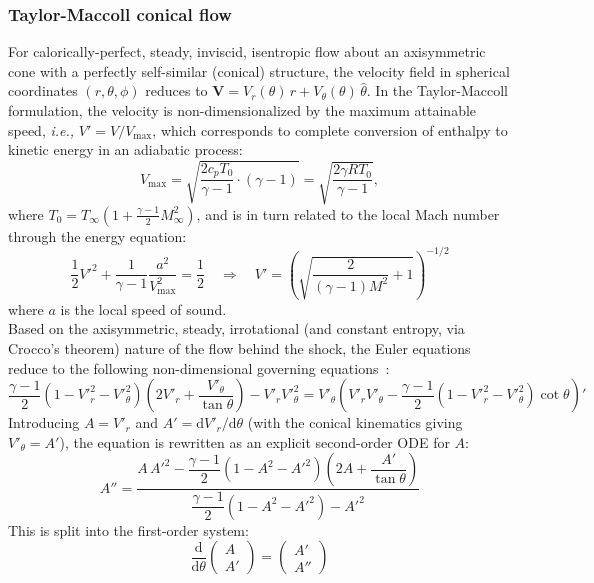 \documentclass[10pt,a4paper]{article}
\begin{document}
\subsubsection{Taylor-Maccoll conical flow}
For calorically-perfect, steady, inviscid, isentropic flow about an axisymmetric cone with a perfectly self-similar (conical) structure, the velocity field in spherical coordinates $(r, \theta, \phi)$ reduces to $\mathbf{V} = V_r(\theta)\,\hat{r} + V_\theta(\theta)\,\hat{\theta}$. In the Taylor-Maccoll formulation, the velocity is non-dimensionalized by the maximum attainable speed, \textit{i.e.,} $V'=V/V_{\max}$, which corresponds to complete conversion of enthalpy to kinetic energy in an adiabatic process:
\begin{equation}
    V_{\max} = \sqrt{\frac{2 c_p T_0}{\gamma - 1} \cdot (\gamma - 1)}
             = \sqrt{\frac{2 \gamma R T_0}{\gamma - 1}},
    \label{eq:Vmax}
\end{equation}
where $T_0=T_\infty\!\left(1 + \tfrac{\gamma-1}{2}M_\infty^2\right)$, and is in turn related to the local Mach number through the energy equation:
\begin{equation}
    \frac{1}{2} V'^2 + \frac{1}{\gamma - 1}\frac{a^2}{V_{\max}^2} = \frac{1}{2}
    \quad\Longrightarrow\quad
    V' = \left(\sqrt{\dfrac{2}{(\gamma-1)M^2}+1}\right)^{-1/2}
    \label{eq:Vprime}
\end{equation}
where $a$ is the local speed of sound.\\

Based on the axisymmetric, steady, irrotational (and constant entropy, via Crocco's theorem) nature of the flow behind the shock, the Euler equations reduce to the following non-dimensional governing equations~\cite{Maccoll:1937}:
\begin{equation}
    \frac{\gamma-1}{2}
    \left(1 - V'^2_r - V'^2_\theta\right)
    \left(2V'_r + \frac{V'_\theta}{\tan\theta}\right)
    -V'_r V'^2_\theta
    = V'_\theta
    \left(V'_r V'_\theta - \frac{\gamma-1}{2}(1-V'^2_r - V'^2_\theta)\cot\theta\right)'
    \label{eq:TM_raw}
\end{equation}
Introducing $A = V'_r$ and $A' = \mathrm{d}V'_r/\mathrm{d}\theta$ (with the conical kinematics giving $V'_\theta = A'$), the equation is rewritten as an explicit second-order ODE for $A$:
\begin{equation}
    A'' = \frac{A\,A'^2 - \dfrac{\gamma-1}{2}(1-A^2-A'^2)\!\left(2A + \dfrac{A'}{\tan\theta}\right)}
              {\dfrac{\gamma-1}{2}(1-A^2-A'^2) - A'^2}\label{eq:TM}
\end{equation}
This is split into the first-order system:
\begin{equation}
    \frac{\mathrm{d}}{\mathrm{d}\theta}
    \begin{pmatrix} A \\ A' \end{pmatrix} =
    \begin{pmatrix} A' \\ A'' \end{pmatrix}
\end{equation}
\end{document}

